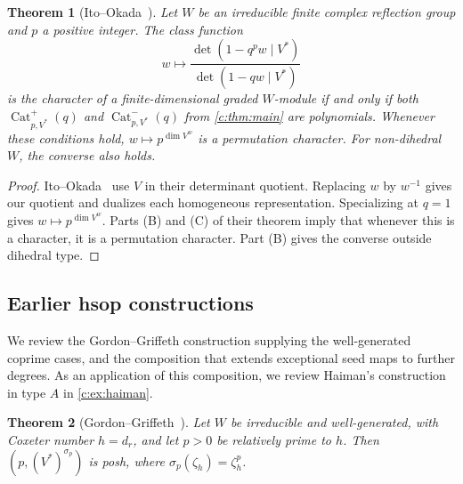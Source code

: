 \documentclass[10pt,a4paper]{amsart}
\DeclareMathOperator{\Cat}{Cat}
\newtheorem{theorem}{Theorem}[section]
\theoremstyle{definition}
\begin{document}
\begin{theorem}[Ito--Okada~{\cite[Theorem 1.4]{IO}}]\label{b:thm:IO}
Let $W$ be an irreducible finite complex reflection group and $p$ a
positive integer. The class function
\[
 w\longmapsto
 \frac{\det(1-q^p w\mid V^*)}{\det(1-qw\mid V^*)}
\]
is the character of a finite-dimensional graded $W$-module if and only
if both $\Cat^+_{p,V^*}(q)$ and $\Cat^-_{p,V^*}(q)$ from
\cref{c:thm:main} are polynomials. Whenever these conditions hold,
$w\mapsto p^{\dim V^w}$ is a permutation character. For non-dihedral
$W$, the converse also holds.
\end{theorem}
\begin{proof}
Ito--Okada~\cite[Theorem 1.4(A)]{IO} use $V$ in their determinant
quotient. Replacing $w$ by $w^{-1}$ gives our quotient and dualizes
each homogeneous representation. Specializing at $q=1$ gives
$w\mapsto p^{\dim V^w}$. Parts (B) and (C) of their theorem imply
that whenever this is a character, it is a permutation character.
Part (B) gives the converse outside dihedral type.
\end{proof}

\subsection{Earlier hsop constructions}\label{c:sec:cherednik}

We review the Gordon--Griffeth construction supplying the well-generated
coprime cases, and the composition that extends exceptional
seed maps to further degrees. As an application of this composition,
we review Haiman's construction in type $A$ in \cref{c:ex:haiman}.

\begin{theorem}[{Gordon--Griffeth~\cite[Theorem~2.11 and Section~2.18]{GG}}]
\label{c:thm:GG}
Let $W$ be irreducible and well-generated, with Coxeter number $h=d_r$,
and let $p>0$ be relatively prime to $h$. Then
$(p,(V^*)^{\sigma_p})$ is posh, where $\sigma_p(\zeta_h)=\zeta_h^p$.
\end{theorem}
\end{document}
